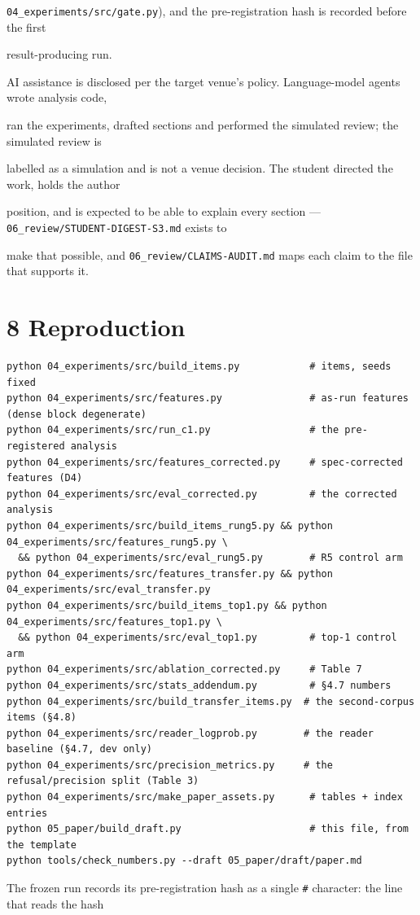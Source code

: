 \texttt{04\_experiments/\allowbreak{}src/\allowbreak{}gate.py}), and the pre-registration hash is recorded before the first

result-producing run.

AI assistance is disclosed per the target venue's policy. Language-model agents wrote analysis code,

ran the experiments, drafted sections and performed the simulated review; the simulated review is

labelled as a simulation and is not a venue decision. The student directed the work, holds the author

position, and is expected to be able to explain every section --- \texttt{06\_review/\allowbreak{}STUDENT-DIGEST-S3.md} exists to

make that possible, and \texttt{06\_review/\allowbreak{}CLAIMS-AUDIT.md} maps each claim to the file that supports it.

\section{8 Reproduction}
\begin{footnotesize}
\begin{verbatim}
python 04_experiments/src/build_items.py            # items, seeds fixed
python 04_experiments/src/features.py               # as-run features (dense block degenerate)
python 04_experiments/src/run_c1.py                 # the pre-registered analysis
python 04_experiments/src/features_corrected.py     # spec-corrected features (D4)
python 04_experiments/src/eval_corrected.py         # the corrected analysis
python 04_experiments/src/build_items_rung5.py && python 04_experiments/src/features_rung5.py \
  && python 04_experiments/src/eval_rung5.py        # R5 control arm
python 04_experiments/src/features_transfer.py && python 04_experiments/src/eval_transfer.py
python 04_experiments/src/build_items_top1.py && python 04_experiments/src/features_top1.py \
  && python 04_experiments/src/eval_top1.py         # top-1 control arm
python 04_experiments/src/ablation_corrected.py     # Table 7
python 04_experiments/src/stats_addendum.py         # §4.7 numbers
python 04_experiments/src/build_transfer_items.py  # the second-corpus items (§4.8)
python 04_experiments/src/reader_logprob.py        # the reader baseline (§4.7, dev only)
python 04_experiments/src/precision_metrics.py     # the refusal/precision split (Table 3)
python 04_experiments/src/make_paper_assets.py      # tables + index entries
python 05_paper/build_draft.py                      # this file, from the template
python tools/check_numbers.py --draft 05_paper/draft/paper.md
\end{verbatim}
\end{footnotesize}
The frozen run records its pre-registration hash as a single \texttt{\#} character: the line that reads the hash

